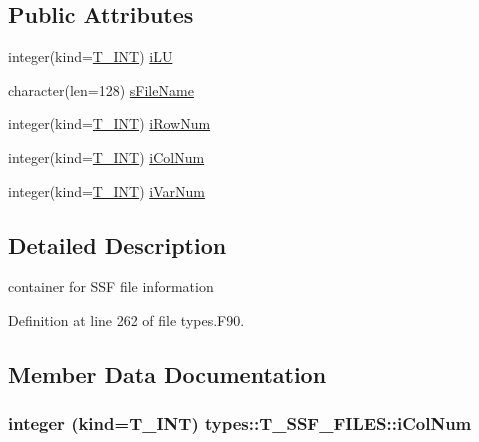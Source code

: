 \subsection*{Public Attributes}
\begin{DoxyCompactItemize}
\item 
integer(kind=\hyperlink{namespacetypes_a4e4d040a4425196c4d43be63e7e6103a}{T\_\-INT}) \hyperlink{typetypes_1_1_t___s_s_f___f_i_l_e_s_ab983ef3514c66132985ad891dc8c87e9}{iLU}
\item 
character(len=128) \hyperlink{typetypes_1_1_t___s_s_f___f_i_l_e_s_aa4d606df754cb64c0059667bdf99f80c}{sFileName}
\item 
integer(kind=\hyperlink{namespacetypes_a4e4d040a4425196c4d43be63e7e6103a}{T\_\-INT}) \hyperlink{typetypes_1_1_t___s_s_f___f_i_l_e_s_a91af02312e475f83174850646de06a0b}{iRowNum}
\item 
integer(kind=\hyperlink{namespacetypes_a4e4d040a4425196c4d43be63e7e6103a}{T\_\-INT}) \hyperlink{typetypes_1_1_t___s_s_f___f_i_l_e_s_a51ca15a436bfc26baf361c05729f3a22}{iColNum}
\item 
integer(kind=\hyperlink{namespacetypes_a4e4d040a4425196c4d43be63e7e6103a}{T\_\-INT}) \hyperlink{typetypes_1_1_t___s_s_f___f_i_l_e_s_a1ef52aa6a1e2056f4f925b75532f8fab}{iVarNum}
\end{DoxyCompactItemize}


\subsection{Detailed Description}
container for SSF file information 

Definition at line 262 of file types.F90.



\subsection{Member Data Documentation}
\hypertarget{typetypes_1_1_t___s_s_f___f_i_l_e_s_a51ca15a436bfc26baf361c05729f3a22}{
\subsubsection[{iColNum}]{\setlength{\rightskip}{0pt plus 5cm}integer (kind={\bf T\_\-INT}) {\bf types::T\_\-SSF\_\-FILES::iColNum}}}
\label{typetypes_1_1_t___s_s_f___f_i_l_e_s_a51ca15a436bfc26baf361c05729f3a22}


